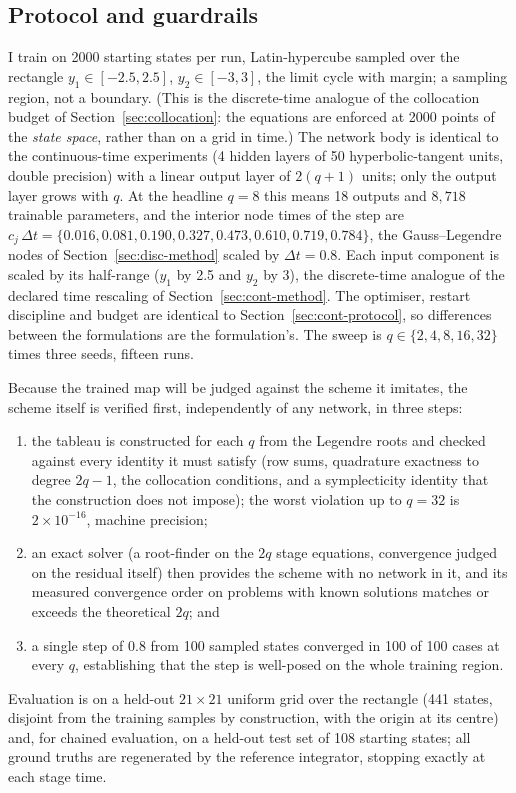 \documentclass[11pt,a4paper]{article}
\begin{document}
\subsection{Protocol and guardrails}
\label{sec:guardrails}

I train on 2000 starting states per run, Latin-hypercube sampled over
the rectangle $y_1 \in [-2.5, 2.5]$, $y_2 \in [-3, 3]$, the limit cycle
with margin; a sampling region, not a boundary. (This is the discrete-time
analogue of the collocation budget of Section~\ref{sec:collocation}: the
equations are enforced at 2000 points of the \emph{state space}, rather
than on a grid in time.) The network body is identical to the
continuous-time experiments (4 hidden layers of 50 hyperbolic-tangent
units, double precision) with a linear output layer of $2(q+1)$ units;
only the output layer grows with $q$. At the headline $q = 8$ this means
18 outputs and $8{,}718$ trainable parameters, and the interior node
times of the step are
$c_j\,\Delta t = \{0.016, 0.081, 0.190, 0.327, 0.473, 0.610, 0.719,
0.784\}$, the Gauss--Legendre nodes of
Section~\ref{sec:disc-method} scaled by $\Delta t = 0.8$. Each input
component is scaled by its half-range ($y_1$ by 2.5 and $y_2$ by
3), the discrete-time analogue of the declared time rescaling of
Section~\ref{sec:cont-method}. The optimiser, restart discipline and
budget are identical to Section~\ref{sec:cont-protocol}, so differences
between the formulations are the formulation's. The sweep is
$q \in \{2, 4, 8, 16, 32\}$ times three seeds, fifteen runs.

Because the trained map will be judged against the scheme it imitates, the
scheme itself is verified first, independently of any network, in three
steps:
\begin{enumerate}
  \item the tableau is constructed for each $q$ from the Legendre roots
  and checked against every identity it must satisfy (row sums, quadrature
  exactness to degree $2q-1$, the collocation conditions, and a
  symplecticity identity that the construction does not impose); the
  worst violation up to $q = 32$ is $2\times10^{-16}$, machine precision;
  \item an exact solver (a root-finder on the $2q$ stage equations,
  convergence judged on the residual itself) then provides the scheme
  with no network in it, and its measured convergence order on problems
  with known solutions matches or exceeds the theoretical $2q$; and
  \item a single step of $0.8$ from 100 sampled states converged in 100
  of 100 cases at every $q$, establishing that the step is well-posed on
  the whole training region.
\end{enumerate}
Evaluation is on a held-out $21\times21$ uniform grid over
the rectangle (441 states, disjoint from the training samples by
construction, with the origin at its centre) and, for chained evaluation,
on a held-out test set of 108 starting states; all ground truths are
regenerated by the reference integrator, stopping exactly at each stage
time.
\end{document}
